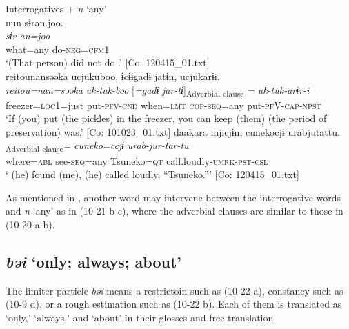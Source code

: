 \ea\label{ex:10.21}   Interrogatives + \textit{n} ‘any’\\
  \ea  %
      \glll    nun  sɨran.joo.\\
      \textit{}  \textit{sɨr-an=joo}\\
      what=any  do-\textsc{neg}=\textsc{cfm}1\\
      \glt       ‘(That person) did not do .’ [Co: 120415\_01.txt]
  \ex\relax [= (8-44 a)]\\
      \glll    {\textbar}reitou{\textbar}nansəəka  ucjukuboo,  ɨcɨɨgadɨ  jatɨn,  ucjukarɨi.\\
      \textit{reitou=nan=səəka}  \textit{uk-tuk-boo}  [\textit{=gadɨ}  {\textit{jar-tɨ}]\textsubscript{Adverbial clause} \textit{=}} \textit{uk-tuk-arɨr-i}\\
      freezer=\textsc{loc}1=just  put-\textsc{pfv}-\textsc{cnd}  when=\textsc{lmt}  \textsc{cop}-\textsc{seq}=any  put-\textsc{pf}V-\textsc{cap}-\textsc{npst}\\
      \glt       ‘If (you) put (the pickles) in the freezer, you can keep (them)  (the period of preservation) was.’ [Co: 101023\_01.txt]
  \ex  %
      \glll    daakara  mjicjɨn,  cunekocjɨ  urabjutattu.\\
      [\textit{\Highlight{daa}=kara}  \textit{mj-tɨ}]\textsubscript{Adverbial clause}\textit{=}  \textit{cuneko=ccjɨ}  \textit{urab-jur-tar-tu}\\
      where=\textsc{abl}  see-\textsc{seq}=any  Tsuneko=\textsc{qt}  call.loudly-\textsc{umrk}-\textsc{pst}-\textsc{csl}\\
      \glt       ‘ (he) found (me), (he) called loudly, “Tsuneko.”’ [Co: 120415\_01.txt]
    \z
\z

As mentioned in , another word may intervene between the interrogative words and \textit{n} ‘any’ as in (10-21 b-c), where the adverbial clauses are similar to those in (10-20 a-b).

\subsection{\textit{bəi} ‘only; always; about’}\label{sec:10.1.4}

The limiter particle \textit{bəi} means a restrictoin such as (10-22 a), constancy such as (10-9 d), or a rough estimation such as (10-22 b). Each of them is translated as ‘only,’ ‘always,’ and ‘about’ in their glosses and free translation.

